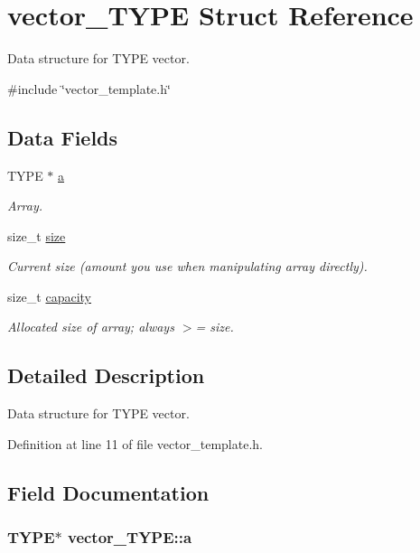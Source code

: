\hypertarget{structvector___t_y_p_e}{\section{vector\-\_\-\-T\-Y\-P\-E \-Struct \-Reference}
\label{structvector___t_y_p_e}
}


\-Data structure for \-T\-Y\-P\-E vector.  




{\ttfamily \#include \char`\"{}vector\-\_\-template.\-h\char`\"{}}

\subsection*{\-Data \-Fields}
\begin{DoxyCompactItemize}
\item 
\-T\-Y\-P\-E $\ast$ \hyperlink{structvector___t_y_p_e_a7a2bcca1e061603bab751260e26986e1}{a}
\begin{DoxyCompactList}\small\item\em \-Array. \end{DoxyCompactList}\item 
size\-\_\-t \hyperlink{structvector___t_y_p_e_a5c187692d3e0d1659d7024a751ec4b4d}{size}
\begin{DoxyCompactList}\small\item\em \-Current size (amount you use when manipulating array directly). \end{DoxyCompactList}\item 
size\-\_\-t \hyperlink{structvector___t_y_p_e_aa2f337cea7d3cb1e1ed4f5ee5a22678f}{capacity}
\begin{DoxyCompactList}\small\item\em \-Allocated size of array; always $>$= size. \end{DoxyCompactList}\end{DoxyCompactItemize}


\subsection{\-Detailed \-Description}
\-Data structure for \-T\-Y\-P\-E vector. 



\-Definition at line 11 of file vector\-\_\-template.\-h.



\subsection{\-Field \-Documentation}
\hypertarget{structvector___t_y_p_e_a7a2bcca1e061603bab751260e26986e1}{
\subsubsection[{a}]{\setlength{\rightskip}{0pt plus 5cm}\-T\-Y\-P\-E$\ast$ {\bf vector\-\_\-\-T\-Y\-P\-E\-::a}}}\label{structvector___t_y_p_e_a7a2bcca1e061603bab751260e26986e1}


